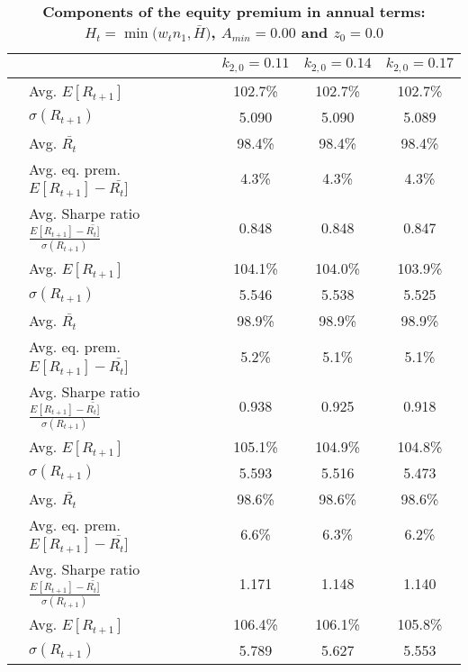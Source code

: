 \documentclass[letterpaper,12pt]{article}
\theoremstyle{definition}
\begin{document}
\begin{spacing}{1.5}
  \begin{table}[htbp]\centering\captionsetup{width=6.0in}
    \caption{\label{TabEqPrem_A0}\textbf{Components of the equity premium in annual terms: $H_t = \min\bigl(w_t n_1, \bar{H}\bigr)$, $A_{min}=0.00$ and $z_0=0.0$}}
    \begin{threeparttable}
    \begin{tabular}{>{\small}l| >{\small}l| >{\small}c| >{\small}c| >{\small}c}
      \hline\hline
      & & $k_{2,0}=0.11$ & $k_{2,0}=0.14$ & $k_{2,0}=0.17$ \\
      \hline
      \multirow{5}{*}{$\bar{H}=0.00$} & \quad Avg. $E[R_{t+1}]$ & 102.7\% & 102.7\% & 102.7\% \\
      & \quad $\sigma(R_{t+1})$ & 5.090 & 5.090 & 5.089 \\
      & \quad Avg. $\bar{R_t}$ & 98.4\% & 98.4\% & 98.4\% \\
      & \quad Avg. eq. prem. $E[R_{t+1}] - \bar{R_t]}$ & 4.3\% & 4.3\% & 4.3\% \\
      & \quad Avg. Sharpe ratio $\frac{E[R_{t+1}] - \bar{R_t]}}{\sigma(R_{t+1})}$ & 0.848 & 0.848 & 0.847 \\
      \hline
      \multirow{5}{*}{$\bar{H}=0.05$} & \quad Avg. $E[R_{t+1}]$ & 104.1\% & 104.0\% & 103.9\% \\
      & \quad $\sigma(R_{t+1})$ & 5.546 & 5.538 & 5.525 \\
      & \quad Avg. $\bar{R_t}$ & 98.9\% & 98.9\% & 98.9\% \\
      & \quad Avg. eq. prem. $E[R_{t+1}] - \bar{R_t]}$ & 5.2\% & 5.1\% & 5.1\% \\
      & \quad Avg. Sharpe ratio $\frac{E[R_{t+1}] - \bar{R_t]}}{\sigma(R_{t+1})}$ & 0.938 & 0.925 & 0.918 \\
      \hline
      \multirow{5}{*}{$\bar{H}=0.11$} & \quad Avg. $E[R_{t+1}]$ & 105.1\% & 104.9\% & 104.8\% \\
      & \quad $\sigma(R_{t+1})$ & 5.593 & 5.516 & 5.473 \\
      & \quad Avg. $\bar{R_t}$ & 98.6\% & 98.6\% & 98.6\% \\
      & \quad Avg. eq. prem. $E[R_{t+1}] - \bar{R_t]}$ & 6.6\% & 6.3\% & 6.2\% \\
      & \quad Avg. Sharpe ratio $\frac{E[R_{t+1}] - \bar{R_t]}}{\sigma(R_{t+1})}$ & 1.171 & 1.148 & 1.140 \\
      \hline
      \multirow{5}{*}{$\bar{H}=0.17$} & \quad Avg. $E[R_{t+1}]$ & 106.4\% & 106.1\% & 105.8\% \\
      & \quad $\sigma(R_{t+1})$ & 5.789 & 5.627 & 5.553 \\

\end{tabular}
\end{threeparttable}
\end{table}
\end{spacing}
\end{document}
